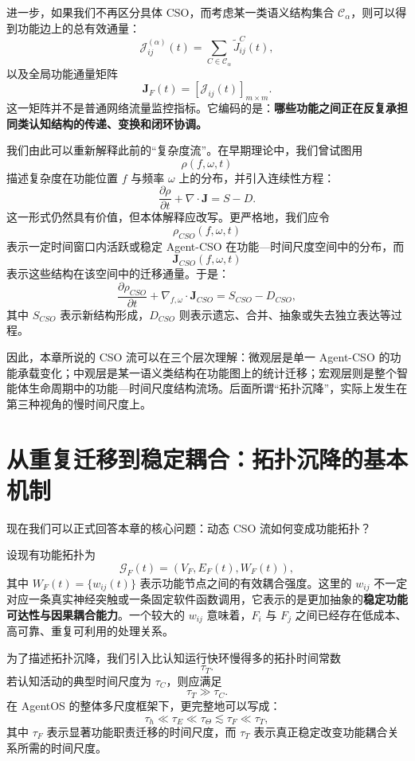 进一步，如果我们不再区分具体 CSO，而考虑某一类语义结构集合 $\mathcal{C}_{\alpha}$，则可以得到功能边上的总有效通量：
\[
\mathcal{J}_{ij}^{(\alpha)}(t)
=
\sum_{C\in\mathcal{C}_{\alpha}}
\widetilde{J}_{ij}^{C}(t),
\]
以及全局功能通量矩阵
\[
\mathbf{J}_{F}(t)
=
\left[
\mathcal{J}_{ij}(t)
\right]_{m\times m}.
\]
这一矩阵并不是普通网络流量监控指标。它编码的是：\textbf{哪些功能之间正在反复承担同类认知结构的传递、变换和闭环协调。}

我们由此可以重新解释此前的``复杂度流''。在早期理论中，我们曾试图用
\[
\rho(f,\omega,t)
\]
描述复杂度在功能位置 $f$ 与频率 $\omega$ 上的分布，并引入连续性方程：
\[
\frac{\partial\rho}{\partial t}
+
\nabla\cdot\mathbf{J}
=
S-D.
\]
这一形式仍然具有价值，但本体解释应改写。更严格地，我们应令
\[
\rho_{CSO}(f,\omega,t)
\]
表示一定时间窗口内活跃或稳定 Agent-CSO 在功能—时间尺度空间中的分布，而
\[
\mathbf{J}_{CSO}(f,\omega,t)
\]
表示这些结构在该空间中的迁移通量。于是：
\[
\frac{\partial\rho_{CSO}}{\partial t}
+
\nabla_{f,\omega}\cdot
\mathbf{J}_{CSO}
=
S_{CSO}-D_{CSO},
\]
其中 $S_{CSO}$ 表示新结构形成，$D_{CSO}$ 则表示遗忘、合并、抽象或失去独立表达等过程。

因此，本章所说的 CSO 流可以在三个层次理解：微观层是单一 Agent-CSO 的功能承载变化；中观层是某一语义类结构在功能图上的统计迁移；宏观层则是整个智能体生命周期中的功能—时间尺度结构流场。后面所谓``拓扑沉降''，实际上发生在第三种视角的慢时间尺度上。


\section{从重复迁移到稳定耦合：拓扑沉降的基本机制}

现在我们可以正式回答本章的核心问题：动态 CSO 流如何变成功能拓扑？

设现有功能拓扑为
\[
\mathcal{G}_F(t)
=
\left(
V_F,
E_F(t),
W_F(t)
\right),
\]
其中 $W_F(t)=\{w_{ij}(t)\}$ 表示功能节点之间的有效耦合强度。这里的 $w_{ij}$ 不一定对应一条真实神经突触或一条固定软件函数调用，它表示的是更加抽象的\textbf{稳定功能可达性与因果耦合能力}。一个较大的 $w_{ij}$ 意味着，$F_i$ 与 $F_j$ 之间已经存在低成本、高可靠、重复可利用的处理关系。

为了描述拓扑沉降，我们引入比认知运行快环慢得多的拓扑时间常数
\[
\tau_T.
\]
若认知活动的典型时间尺度为 $\tau_C$，则应满足
\[
\boxed{
\tau_T
\gg
\tau_C.
}
\]
在 AgentOS 的整体多尺度框架下，更完整地可以写成：
\[
\tau_h
\ll
\tau_E
\ll
\tau_\Theta
\lesssim
\tau_F
\ll
\tau_T,
\]
其中 $\tau_F$ 表示显著功能职责迁移的时间尺度，而 $\tau_T$ 表示真正稳定改变功能耦合关系所需的时间尺度。

